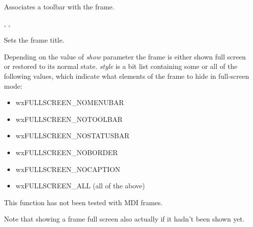 Associates a toolbar with the frame.


, ,\rtfsp
{}

\label{wxframesettitle}


Sets the frame title.





\label{wxframeshowfullscreen}


Depending on the value of {\it show} parameter the frame is either shown full
screen or restored to its normal state. {\it style} is a bit list containing
some or all of the following values, which indicate what elements of the frame
to hide in full-screen mode:

\begin{itemize}\itemsep=0pt
\item wxFULLSCREEN\_NOMENUBAR
\item wxFULLSCREEN\_NOTOOLBAR
\item wxFULLSCREEN\_NOSTATUSBAR
\item wxFULLSCREEN\_NOBORDER
\item wxFULLSCREEN\_NOCAPTION
\item wxFULLSCREEN\_ALL (all of the above)
\end{itemize}

This function has not been tested with MDI frames.

Note that showing a frame full screen also actually
 if it hadn't been shown yet.



